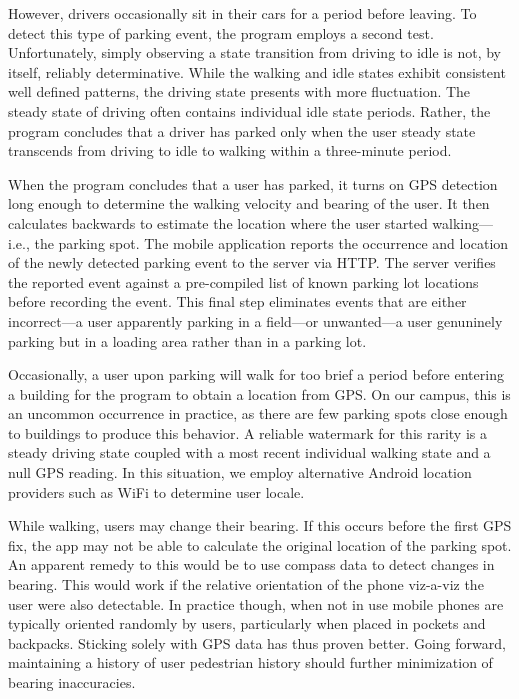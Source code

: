 However, drivers occasionally sit in their cars for a period before leaving.
To detect this type of parking event, the program employs a second test.
Unfortunately, simply observing a state transition from driving to idle is
not, by itself, reliably determinative. While the walking and idle states
exhibit consistent well defined patterns, the driving state presents with
more fluctuation. The steady state of driving often contains individual idle
state periods. Rather, the program concludes that a driver has parked only
when the user steady state transcends from driving to idle to walking within
a three-minute period.

When the program concludes that a user has parked, it turns on GPS detection
long enough to determine the walking velocity and bearing of the user. It
then calculates backwards to estimate the location where the user started
walking---i.e., the parking spot. The mobile application reports the
occurrence and location of the newly detected parking event to the server via
HTTP. The server verifies the reported event against a pre-compiled list of
known parking lot locations before recording the event. This final step
eliminates events that are either incorrect---a user apparently parking in
a field---or unwanted---a user genuninely parking but in a loading area rather
than in a parking lot.

Occasionally, a user upon parking will walk for too brief a period before
entering a building for the program to obtain a location from GPS. On our
campus, this is an uncommon occurrence in practice, as there are few parking
spots close enough to buildings to produce this behavior. A reliable watermark
for this rarity is a steady driving state coupled with a most recent
individual walking state and a null GPS reading. In this situation, we employ
alternative Android location providers such as WiFi to determine user locale.

While walking, users may change their bearing. If this occurs before the
first GPS fix, the app may not be able to calculate the original location of
the parking spot. An apparent remedy to this would be to use compass data to
detect changes in bearing. This would work if the relative orientation of the
phone viz-a-viz the user were also detectable. In practice though, when not
in use mobile phones are typically oriented randomly by users, particularly
when placed in pockets and backpacks. Sticking solely with GPS data has thus
proven better. Going forward, maintaining a history of user pedestrian
history should further minimization of bearing inaccuracies.


